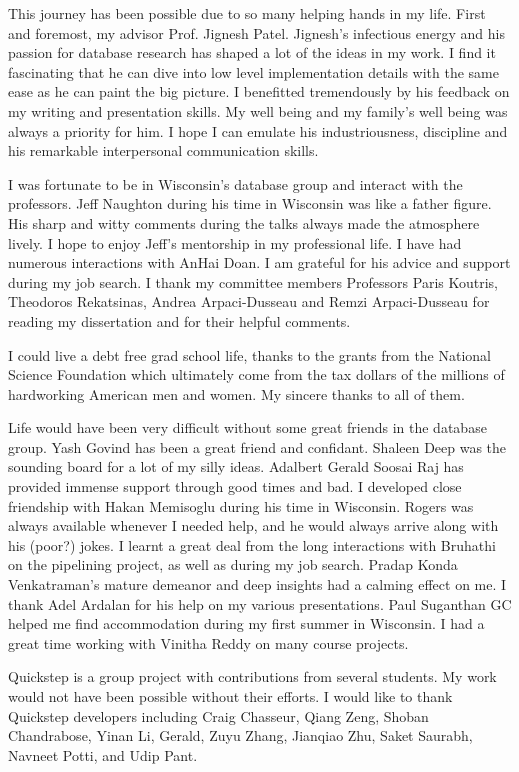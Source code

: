This journey has been possible due to so many helping hands in my life. 
First and foremost, my advisor Prof. Jignesh Patel. 
Jignesh's infectious energy and his passion for database research has shaped a lot of the ideas in my work.
I find it fascinating that he can dive into low level implementation details with the same ease as he can paint the big picture.
I benefitted tremendously by his feedback on my writing and presentation skills. 
My well being and my family's well being was always a priority for him. 
I hope I can emulate his industriousness, discipline and his remarkable interpersonal communication skills. 

I was fortunate to be in Wisconsin's database group and interact with the professors. 
Jeff Naughton during his time in Wisconsin was like a father figure. 
His sharp and witty comments during the talks always made the atmosphere lively. 
I hope to enjoy Jeff's mentorship in my professional life. 
I have had numerous interactions with AnHai Doan.
I am grateful for his advice and support during my job search.
I thank my committee members Professors Paris Koutris, Theodoros Rekatsinas, Andrea Arpaci-Dusseau and Remzi Arpaci-Dusseau for reading my dissertation and for their helpful comments. 

I could live a debt free grad school life, thanks to the grants from the National Science Foundation which  ultimately come from the tax dollars of the millions of hardworking American men and women. 
My sincere thanks to all of them.

Life would have been very difficult without some great friends in the database group. 
Yash Govind has been a great friend and confidant.
Shaleen Deep was the sounding board for a lot of my silly ideas.
Adalbert Gerald Soosai Raj has provided immense support through good times and bad. 
I developed close friendship with Hakan Memisoglu during his time in Wisconsin.
Rogers was always available whenever I needed help, and he would always arrive along with his (poor?) jokes. 
I learnt a great deal from the long interactions with Bruhathi on the pipelining project, as well as during my job search.
Pradap Konda Venkatraman's mature demeanor and deep insights had a calming effect on me.
I thank Adel Ardalan for his help on my various presentations. 
Paul Suganthan GC helped me find accommodation during my first summer in Wisconsin. 
I had a great time working with Vinitha Reddy on many course projects.

Quickstep is a group project with contributions from several students.
My work would not have been possible without their efforts. 
I would like to thank Quickstep developers including Craig Chasseur, Qiang Zeng, Shoban Chandrabose, Yinan Li, Gerald, Zuyu Zhang, Jianqiao Zhu, Saket Saurabh, Navneet Potti, and Udip Pant.  

